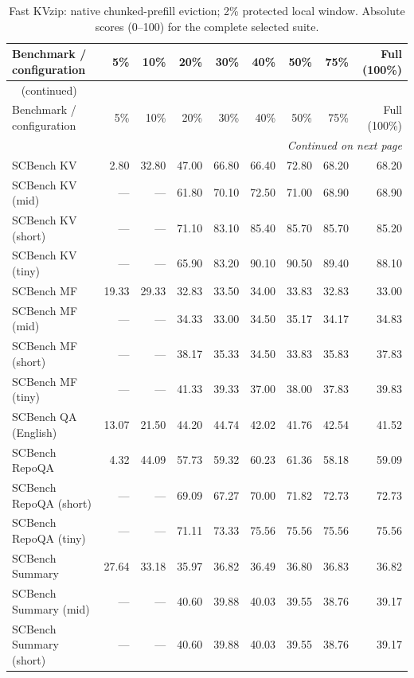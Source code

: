 \begingroup
\small
\setlength{\tabcolsep}{4pt}
\begin{longtable}{@{}lrrrrrrrr@{}}
\caption{Fast KVzip: native chunked-prefill eviction; 2\% protected local window. Absolute scores (0--100) for the complete selected suite.}
\label{tab:results-fastkvzip} \\
\hline
Benchmark / configuration & 5\% & 10\% & 20\% & 30\% & 40\% & 50\% & 75\% & Full (100\%) \\
\hline
\endfirsthead
\multicolumn{9}{l}{\tablename\ \thetable{} (continued)} \\
\hline
Benchmark / configuration & 5\% & 10\% & 20\% & 30\% & 40\% & 50\% & 75\% & Full (100\%) \\
\hline
\endhead
\hline
\multicolumn{9}{r}{\emph{Continued on next page}} \\
\endfoot
\hline
\endlastfoot
SCBench KV & 2.80 & 32.80 & 47.00 & 66.80 & 66.40 & 72.80 & 68.20 & 68.20 \\
SCBench KV (mid) & --- & --- & 61.80 & 70.10 & 72.50 & 71.00 & 68.90 & 68.90 \\
SCBench KV (short) & --- & --- & 71.10 & 83.10 & 85.40 & 85.70 & 85.70 & 85.20 \\
SCBench KV (tiny) & --- & --- & 65.90 & 83.20 & 90.10 & 90.50 & 89.40 & 88.10 \\
SCBench MF & 19.33 & 29.33 & 32.83 & 33.50 & 34.00 & 33.83 & 32.83 & 33.00 \\
SCBench MF (mid) & --- & --- & 34.33 & 33.00 & 34.50 & 35.17 & 34.17 & 34.83 \\
SCBench MF (short) & --- & --- & 38.17 & 35.33 & 34.50 & 33.83 & 35.83 & 37.83 \\
SCBench MF (tiny) & --- & --- & 41.33 & 39.33 & 37.00 & 38.00 & 37.83 & 39.83 \\
SCBench QA (English) & 13.07 & 21.50 & 44.20 & 44.74 & 42.02 & 41.76 & 42.54 & 41.52 \\
SCBench RepoQA & 4.32 & 44.09 & 57.73 & 59.32 & 60.23 & 61.36 & 58.18 & 59.09 \\
SCBench RepoQA (short) & --- & --- & 69.09 & 67.27 & 70.00 & 71.82 & 72.73 & 72.73 \\
SCBench RepoQA (tiny) & --- & --- & 71.11 & 73.33 & 75.56 & 75.56 & 75.56 & 75.56 \\
SCBench Summary & 27.64 & 33.18 & 35.97 & 36.82 & 36.49 & 36.80 & 36.83 & 36.82 \\
SCBench Summary (mid) & --- & --- & 40.60 & 39.88 & 40.03 & 39.55 & 38.76 & 39.17 \\
SCBench Summary (short) & --- & --- & 40.60 & 39.88 & 40.03 & 39.55 & 38.76 & 39.17 \\

\end{longtable}
